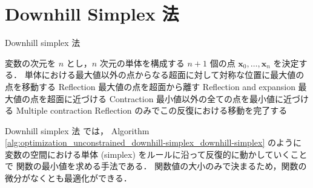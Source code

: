 %

\section{Downhill Simplex 法}

\begin{algorithm}[tp]
    \caption{Downhill simplex 法}
    \label{alg:optimization_unconstrained_downhill-simplex_downhill-simplex}
    \begin{algorithmic}
            \State 変数の次元を $n$ とし，$n$ 次元の単体を構成する
                $n + 1$ 個の点 $\bm{x}_0, \ldots, \bm{x}_{n}$ を決定する．
            \Loop
                \State 単体における最大値以外の点からなる超面に対して対称な位置に最大値の点を移動する
                \Comment Reflection
                    \State 最大値の点を超面から離す
                    \Comment Reflection and expansion
                    \State 最大値の点を超面に近づける
                    \Comment Contraction
                        \State 最小値以外の全ての点を最小値に近づける
                        \Comment Multiple contraction
                    \EndIf
                \Else
                    \State Reflection のみでこの反復における移動を完了する
                \EndIf
                    \State \Return
                \EndIf
            \EndLoop
        \EndProcedure
    \end{algorithmic}
\end{algorithm}

Downhill simplex 法 \cite{Press2007} では，
Algorithm \ref{alg:optimization_unconstrained_downhill-simplex_downhill-simplex} のように
変数の空間における単体 (simplex) をルールに沿って反復的に動かしていくことで
関数の最小値を求める手法である．
関数値の大小のみで決まるため，関数の微分がなくとも最適化ができる．
